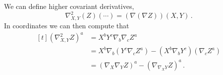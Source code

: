 \documentclass[titlepage,numbers=noenddot,oneside,%
cleardoublepage=empty,paper=a4,fontsize=11pt,%
english,%
]{scrartcl}
\newcommand*{\mathfullstop}{\,.}
\begin{document}
\begin{remark}
    We can define higher covariant derivatives, \eg
    \begin{equation*}
        \nabla^2_{X,Y}(Z)(\cdots)=(\nabla(\nabla Z))(X,Y)\mathfullstop
    \end{equation*}
    In coordinates we can then compute that
    \begin{equation*}
        \begin{aligned}[t]
            (\nabla^2_{X,Y}Z)^a&=X^b Y^c \nabla_b\nabla_c Z^a\\
            &=X^b \nabla_b (Y^c \nabla_c Z^a)-(X^b \nabla_b Y^c)(\nabla_c Z^a)\\
            &=(\nabla_X \nabla_Y Z)^a-(\nabla_{\nabla_X Y}Z)^a\mathfullstop
        \end{aligned}
    \end{equation*}
\end{remark}
\end{document}
